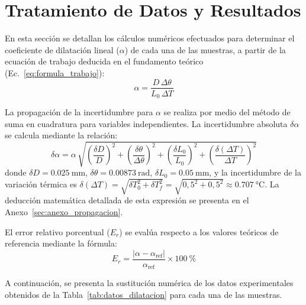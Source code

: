 
\section{Tratamiento de Datos y Resultados}
\label{sec:tratamiento}

En esta sección se detallan los cálculos numéricos efectuados para determinar el coeficiente de dilatación lineal ($\alpha$) de cada una de las muestras, a partir de la ecuación de trabajo deducida en el fundamento teórico (Ec.~\eqref{eq:formula_trabajo}):
\begin{equation}
    \alpha = \frac{D\,\Delta\theta}{L_0\,\Delta T}
    \label{eq:trabajo_calculo}
\end{equation}

La propagación de la incertidumbre para $\alpha$ se realiza por medio del método de suma en cuadratura para variables independientes. La incertidumbre absoluta $\delta\alpha$ se calcula mediante la relación:
\begin{equation}
    \delta\alpha = \alpha\,\sqrt{
        \left(\frac{\delta D}{D}\right)^2 +
        \left(\frac{\delta\theta}{\Delta\theta}\right)^2 +
        \left(\frac{\delta L_0}{L_0}\right)^2 +
        \left(\frac{\delta(\Delta T)}{\Delta T}\right)^2
    }
    \label{eq:propagacion_cuadratura}
\end{equation} 
donde $\delta D = \qty{0,025}{\milli\meter}$, $\delta\theta = \qty{0,00873}{\radian}$, $\delta L_0 = \qty{0,05}{\milli\meter}$, y la incertidumbre de la variación térmica es $\delta(\Delta T) = \sqrt{\delta T_0^2 + \delta T_f^2} = \sqrt{0{,}5^2 + 0{,}5^2} \approx \qty{0,707}{\celsius}$. La deducción matemática detallada de esta expresión se presenta en el Anexo~\ref{sec:anexo_propagacion}.

El error relativo porcentual ($E_r$) se evalúa respecto a los valores teóricos de referencia mediante la fórmula:
\begin{equation}
    E_r = \frac{|\alpha - \alpha_{\text{ref}}|}{\alpha_{\text{ref}}} \times \qty{100}{\percent}
    \label{eq:error_relativo}
\end{equation}

A continuación, se presenta la sustitución numérica de los datos experimentales obtenidos de la Tabla~\ref{tab:datos_dilatacion} para cada una de las muestras.

